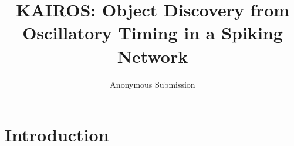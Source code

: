 \documentclass[letterpaper]{article} %
\title{KAIROS: Object Discovery from Oscillatory Timing in a Spiking Network}
\author{
    Anonymous Submission
}
\begin{document}
\maketitle

\begin{abstract}
\end{abstract}

\section{Introduction}






\end{document}
